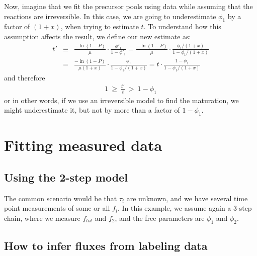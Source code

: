 \documentclass{article}
\begin{document}
Now, imagine that we fit the precursor pools using data while assuming that the reactions are irreversible. In this case, we are going to underestimate $\phi_1$ by a factor of $(1+x)$, when trying to estimate $t$. To understand how this assumption affects the result, we define our new estimate as:
\begin{eqnarray}
    t' &\equiv& \frac{-\ln(1-P)}{\mu} \cdot \frac{\phi'_1}{1 - \phi'_1} 
    = \frac{-\ln(1-P)}{\mu} \cdot \frac{\phi_1/(1+x)}{1 - \phi_1/(1+x)} \nonumber\\
    &=& \frac{-\ln(1-P)}{\mu (1+x)} \cdot \frac{\phi_1}{1 - \phi_1/(1+x)} 
    = t \cdot \frac{1 - \phi_1}{1 - \phi_1/(1+x)}
\end{eqnarray}
and therefore
\begin{eqnarray}
    1 ~\geq~ \frac{t'}{t} ~>~ 1-\phi_1
\end{eqnarray}
or in other words, if we use an irreversible model to find the maturation, we might underestimate it, but not by more than a factor of $1-\phi_1$.

\clearpage
\section{Fitting measured data}

\subsection{Using the 2-step model}
The common scenario would be that $\tau_i$ are unknown, and we have several time point measurements of some or all $f_i$. In this example, we assume again a 3-step chain, where we measure $f_{tot}$ and $f_2$, and the free parameters are $\phi_1$ and $\phi_2$. 

\subsection{How to infer fluxes from labeling data}
\end{document}
